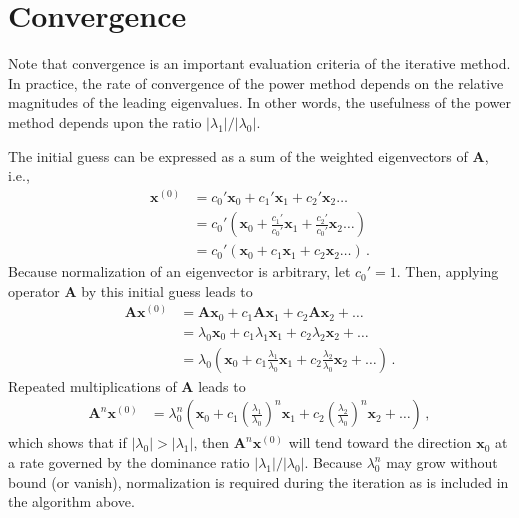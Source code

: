 \section{Convergence}
Note that convergence is an important evaluation criteria of the iterative method. 
In practice, the rate of convergence of the power method depends on the relative magnitudes of the leading eigenvalues. 
In other words, the usefulness of the power method depends upon the ratio $|\lambda_1|/|\lambda_0|$.

The initial guess can be expressed as a sum of the weighted eigenvectors of $\mathbf{A}$, i.e.,
\begin{equation}
\begin{split}
  \mathbf{x}^{(0)} 
     &=  c_0' \mathbf{x}_0 + c_1' \mathbf{x}_1 + c_2'  \mathbf{x}_2 \ldots \,  \\
     &=  c_0' \left (\mathbf{x}_0 + \frac{c_1'}{c_0'} \mathbf{x}_1 + \frac{c_2'}{c_0'} \mathbf{x}_2 \ldots  \right ) \\
     &=  c_0' \left (\mathbf{x}_0 + c_1 \mathbf{x}_1 + c_2 \mathbf{x}_2 \ldots  \right )\, .         
\end{split}
\end{equation}
Because normalization of an eigenvector is arbitrary, let $c_0' = 1$.
Then, applying operator $\mathbf{A}$ by this initial guess leads to 
\begin{equation}
\begin{split}
  \mathbf{A} \mathbf{x}^{(0)} 
   &=  \mathbf{A} \mathbf{x}_0  +  c_1 \mathbf{A} \mathbf{x}_1 + c_2 \mathbf{A} \mathbf{x}_2 + \ldots \\
   &= \lambda_0 \mathbf{x}_0 + c_1 \lambda_1 \mathbf{x}_1 + c_2 \lambda_2 \mathbf{x}_2 + \ldots \\ 
   &= \lambda_0 \left ( \mathbf{x}_0 + c_1 \frac{\lambda_1}{\lambda_0} \mathbf{x}_1 + c_2 \frac{\lambda_2}{\lambda_0} \mathbf{x}_2 + \ldots \right ) \, .
\end{split}
\end{equation}
Repeated multiplications of $\mathbf{A}$ leads to
\begin{equation}
\begin{split}
  \mathbf{A}^n \mathbf{x}^{(0)} 
   &= \lambda^n_0 \left ( \mathbf{x}_0 + c_1 \left( \frac{\lambda_1}{\lambda_0} \right)^n \mathbf{x}_1 + c_2 \left ( \frac{\lambda_2}{\lambda_0} \right )^n \mathbf{x}_2 + \ldots \right ) \, ,
\end{split}
\end{equation}
which shows that if $|\lambda_0| > |\lambda_1|$, then $\mathbf{A}^n \mathbf{x}^{(0)}$ will tend toward the direction $\mathbf{x}_0$ at a rate governed by the dominance ratio $|\lambda_1|/|\lambda_0|$. 
Because $\lambda^n_0$ may grow without bound (or vanish), normalization is required during the iteration as is included in the algorithm above.

